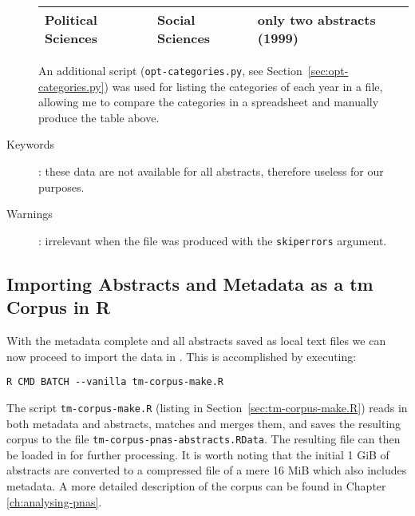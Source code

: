 \begin{description}
\begin{center}
\begin{tabular}{ll p{6cm}}
Political Sciences & Social Sciences & only two abstracts (1999)\\\hline
 \end{tabular}
 \end{center}
An additional script (\texttt{opt-categories.py}, see Section~\ref{sec:opt-categories.py}) was used for listing the categories of each year in a  file, allowing me to compare the categories in a spreadsheet and manually produce the table above.
 \item[Keywords]: these data are not available for all abstracts, therefore useless for our purposes.
 \item[Warnings]: irrelevant when the file was produced with the \texttt{skiperrors} argument.
\end{description}

\subsection{Importing Abstracts and Metadata as a \textbf{tm} Corpus in \textsf{R}}

With the metadata complete and all abstracts saved as local text files we can now proceed to import the data in . This is accomplished by executing:
\begin{verbatim}
R CMD BATCH --vanilla tm-corpus-make.R
\end{verbatim} 

The script \texttt{tm-corpus-make.R} (listing in Section~\ref{sec:tm-corpus-make.R}) reads in both metadata and abstracts, matches and merges them, and saves the resulting  corpus to the file \texttt{tm-corpus-pnas-abstracts.RData}. The resulting file can then be loaded in  for further processing. It is worth noting that the initial 1 GiB of  abstracts are converted to a compressed file of a mere 16 MiB which also includes metadata.
A more detailed description of the corpus can be found in Chapter \ref{ch:analysing-pnas}.




